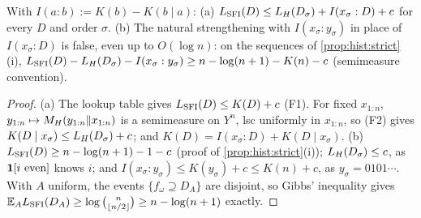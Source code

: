 \begin{proposition}\label{prop:hist:info}
With $I(a:b):=K(b)-K(b\mid a)$: (a) $L_{\mathrm{SFI}}(D)\le L_{H}(D_\sigma)+I(x_\sigma:D)+c$ for every $D$ and order $\sigma$. (b) The natural strengthening with $I(x_\sigma:y_\sigma)$ in place of $I(x_\sigma:D)$ is false, even up to $O(\log n)$: on the sequences of \cref{prop:hist:strict}(i), $L_{\mathrm{SFI}}(D)-L_{H}(D_\sigma)-I(x_\sigma:y_\sigma)\ge n-\log(n+1)-K(n)-c$ (semimeasure convention).
\end{proposition}

\begin{proof}
(a) The lookup table gives $L_{\mathrm{SFI}}(D)\le K(D)+c$ (F1). For fixed $x_{1:n}$, $y_{1:n}\mapsto M_{H}(y_{1:n}\Vert x_{1:n})$ is a semimeasure on $Y^n$, lsc uniformly in $x_{1:n}$, so (F2) gives $K(D\mid x_\sigma)\le L_{H}(D_\sigma)+c$; and $K(D)=I(x_\sigma:D)+K(D\mid x_\sigma)$. (b) $L_{\mathrm{SFI}}(D)\ge n-\log(n+1)-1-c$ (proof of \cref{prop:hist:strict}(i)); $L_{H}(D_\sigma)\le c$, as $\mathbf{1}[i\text{ even}]$ knows $i$; and $I(x_\sigma:y_\sigma)\le K(y_\sigma)+c\le K(n)+c$, as $y_\sigma=0101\cdots$. With $A$ uniform, the events $\{f_\omega\supseteq D_A\}$ are disjoint, so Gibbs' inequality gives $\mathbb{E}_AL_{\mathrm{SFI}}(D_A)\ge\log\binom n{\lfloor n/2\rfloor}\ge n-\log(n+1)$ exactly.
\end{proof}

